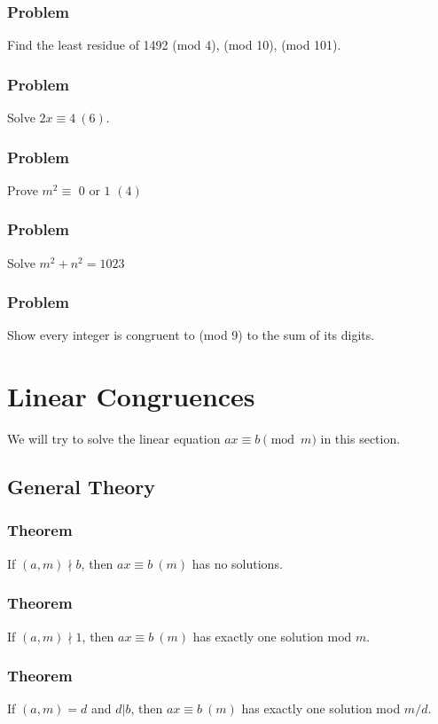 \documentclass{article}
\begin{document}
\subsubsection{Problem}
Find the least residue of 1492 (mod 4), (mod 10), (mod 101).
\vspace{40px}
\subsubsection{Problem}
Solve $2x \equiv 4 \ (6)$.
\vspace{40px}
\subsubsection{Problem}
Prove $m^2 \equiv \text{ 0 or 1 } (4)$
\vspace{40px}
\subsubsection{Problem}
Solve $m^2+n^2=1023$
\vspace{40px}
\subsubsection{Problem}
Show every integer is congruent to (mod 9) to the sum of its digits.
\pagebreak

\section{Linear Congruences}
We will try to solve the linear equation $ax \equiv b \pmod{m}$ in this section.
\subsection{General Theory}
\subsubsection{Theorem}
If $(a, m) \nmid b$, then $ax \equiv b \ (m)$ has no solutions.
\vspace{50px}
\subsubsection{Theorem}
If $(a, m) \nmid 1$, then $ax \equiv b \ (m)$ has exactly one solution mod $m$.
\vspace{50px}
\subsubsection{Theorem}
If $(a, m) = d$ and $d|b$, then $ax \equiv b \ (m)$ has exactly one solution mod $m/d$.
\vspace{50px}
\end{document}
